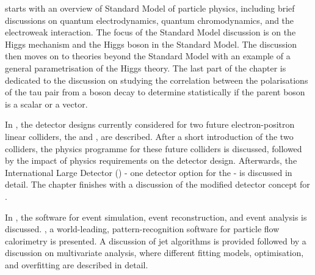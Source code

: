 
 starts with an overview of Standard Model of particle physics, including brief discussions on quantum electrodynamics, quantum chromodynamics, and the electroweak interaction. The focus of the Standard Model discussion is on the  Higgs mechanism and the Higgs boson in the Standard Model. The discussion then moves on to theories beyond the Standard Model with an example of   a general parametrisation of the Higgs theory. The last part of the chapter is dedicated to the discussion on studying the correlation between the polarisations of the  tau pair from a boson decay to determine statistically if the parent boson is a  scalar or a vector.



In , the detector designs currently considered for two future electron-positron linear colliders, the \ILC and \CLIC, are described. After a short introduction of the two colliders, the physics programme for these future colliders is discussed, followed by the impact of physics requirements on the detector design. Afterwards, the International Large Detector (\ILD) - one detector option for the \ILC - is discussed in detail. The chapter finishes with a discussion of the modified \ILD detector concept for \CLIC.

In , the software for event simulation, event reconstruction, and event analysis is  discussed.  \pandora, a world-leading, pattern-recognition software for particle flow calorimetry is presented. A discussion of jet algorithms is provided followed by a discussion on  multivariate analysis, where different fitting models, optimisation, and overfitting are described in detail.




